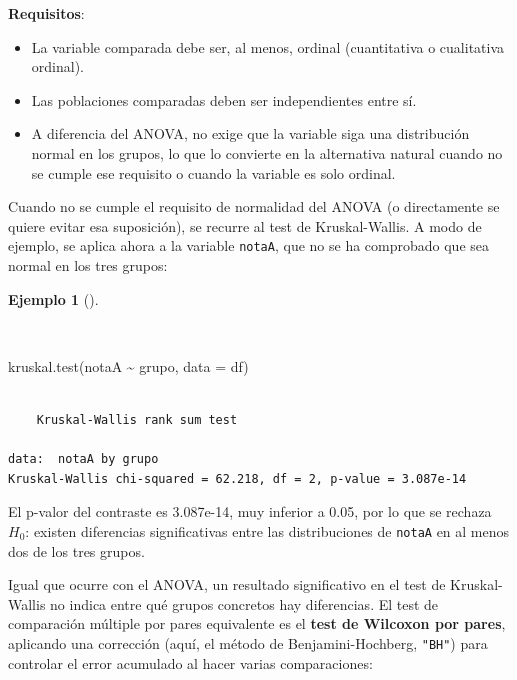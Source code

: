 \documentclass[
  spanish,
  a4paper,
]{scrreport}
\newenvironment{Shaded}{\begin{snugshade}}{\end{snugshade}}
\newcommand{\AttributeTok}[1]{\textcolor[rgb]{0.40,0.45,0.13}{#1}}
\newcommand{\FunctionTok}[1]{\textcolor[rgb]{0.28,0.35,0.67}{#1}}
\newcommand{\NormalTok}[1]{\textcolor[rgb]{0.00,0.23,0.31}{#1}}
\newcommand{\SpecialCharTok}[1]{\textcolor[rgb]{0.37,0.37,0.37}{#1}}
\providecommand{\tightlist}{%
  \setlength{\itemsep}{0pt}\setlength{\parskip}{0pt}}
\theoremstyle{definition}
\newtheorem{example}{Ejemplo}[chapter]
\theoremstyle{definition}
\theoremstyle{remark}
\begin{document}
\textbf{Requisitos}:

\begin{itemize}
\tightlist
\item
  La variable comparada debe ser, al menos, ordinal (cuantitativa o
  cualitativa ordinal).
\item
  Las poblaciones comparadas deben ser independientes entre sí.
\item
  A diferencia del ANOVA, no exige que la variable siga una distribución
  normal en los grupos, lo que lo convierte en la alternativa natural
  cuando no se cumple ese requisito o cuando la variable es solo
  ordinal.
\end{itemize}

Cuando no se cumple el requisito de normalidad del ANOVA (o directamente
se quiere evitar esa suposición), se recurre al test de Kruskal-Wallis.
A modo de ejemplo, se aplica ahora a la variable \texttt{notaA}, que no
se ha comprobado que sea normal en los tres grupos:

\begin{example}[]\protect\hypertarget{exm-masdosindep-kruskal}{}\label{exm-masdosindep-kruskal}

~

\begin{Shaded}
\begin{Highlighting}[]
\FunctionTok{kruskal.test}\NormalTok{(notaA }\SpecialCharTok{\textasciitilde{}}\NormalTok{ grupo, }\AttributeTok{data =}\NormalTok{ df)}
\end{Highlighting}
\end{Shaded}

\begin{verbatim}

    Kruskal-Wallis rank sum test

data:  notaA by grupo
Kruskal-Wallis chi-squared = 62.218, df = 2, p-value = 3.087e-14
\end{verbatim}

El p-valor del contraste es 3.087e-14, muy inferior a 0.05, por lo que
se rechaza \(H_0\): existen diferencias significativas entre las
distribuciones de \texttt{notaA} en al menos dos de los tres grupos.

\end{example}

Igual que ocurre con el ANOVA, un resultado significativo en el test de
Kruskal-Wallis no indica entre qué grupos concretos hay diferencias. El
test de comparación múltiple por pares equivalente es el \textbf{test de
Wilcoxon por pares}, aplicando una corrección (aquí, el método de
Benjamini-Hochberg, \texttt{"BH"}) para controlar el error acumulado al
hacer varias comparaciones:
\end{document}
